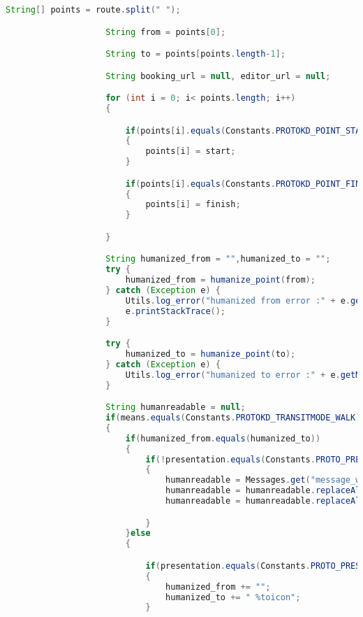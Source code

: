 \begin{lstlisting}[language=Java,basicstyle=\tiny,caption=Application.java]
                    String[] points = route.split(" ");

                    String from = points[0];

                    String to = points[points.length-1];

                    String booking_url = null, editor_url = null;

                    for (int i = 0; i< points.length; i++)
                    {

                        if(points[i].equals(Constants.PROTOKD_POINT_START))
                        {
                            points[i] = start;
                        }

                        if(points[i].equals(Constants.PROTOKD_POINT_FINISH))
                        {
                            points[i] = finish;
                        }

                    }

                    String humanized_from = "",humanized_to = "";
                    try {
                        humanized_from = humanize_point(from);
                    } catch (Exception e) {
                        Utils.log_error("humanized from error :" + e.getMessage());
                        e.printStackTrace();
                    }

                    try {
                        humanized_to = humanize_point(to);
                    } catch (Exception e) {
                        Utils.log_error("humanized to error :" + e.getMessage());
                    }

                    String humanreadable = null;
                    if(means.equals(Constants.PROTOKD_TRANSITMODE_WALK))
                    {
                        if(humanized_from.equals(humanized_to))
                        {
                            if(!presentation.equals(Constants.PROTO_PRESENTATION_MOBILE))
                            {
                                humanreadable = Messages.get("message_walk_samestreet");
                                humanreadable = humanreadable.replaceAll("%street",humanized_from);
                                humanreadable = humanreadable.replaceAll("%distance",format_distance(Double.parseDouble(distance),locale));

                            }
                        }else
                        {

                            if(presentation.equals(Constants.PROTO_PRESENTATION_MOBILE))
                            {
                                humanized_from += "";
                                humanized_to += " %toicon";
                            }


\end{lstlisting}
